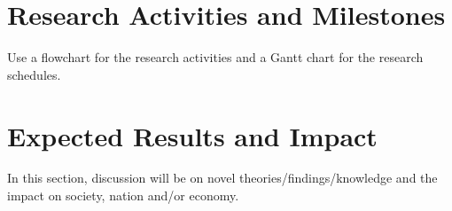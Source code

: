 \documentclass[a4paper, 12pt]{article}
\begin{document}
\section{Research Activities and Milestones}
Use a flowchart for the research activities and a Gantt chart for the research schedules. 

\section{Expected Results and Impact}
In this section, discussion will be on novel theories/findings/knowledge and the impact on society, nation and/or economy.



{}
\end{document}
